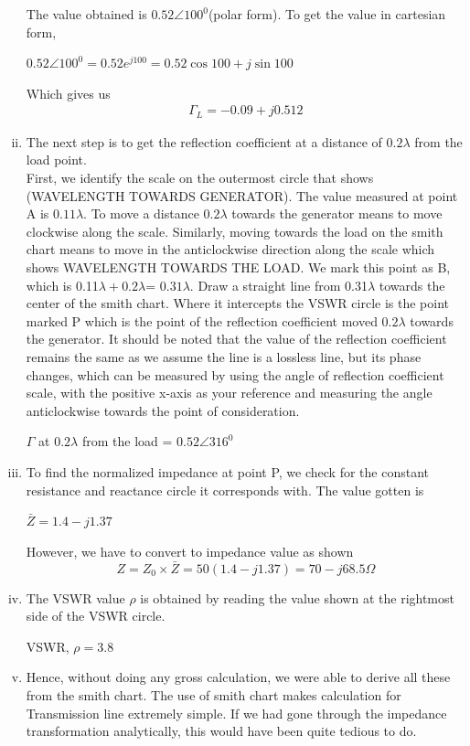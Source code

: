 \begin{example}
\begin{enumerate}[(i)]
The value obtained is $0.52\angle100^{0}$(polar form). To get the value in cartesian form,
\begin{center}
$0.52\angle100^0 = 0.52e^{j100} = 0.52{\cos100 + j\sin100}$
\end{center}
Which gives us
\begin{align*}
\Gamma_{L} = -0.09+j0.512
\end{align*}

\item The next step is to get the reflection coefficient at a distance of $0.2\lambda$ from the load point.\\
First, we identify the scale on the outermost circle that shows (WAVELENGTH TOWARDS GENERATOR). The value measured at point A is $0.11\lambda$. To move a distance $0.2\lambda$ towards the generator means to move clockwise along the scale. Similarly, moving towards the load on the smith chart means to move in the anticlockwise direction along the scale which shows WAVELENGTH TOWARDS THE LOAD. We mark this point as B, which is 0.11$\lambda + 0.2\lambda$= $0.31\lambda$. Draw a straight line from 0.31$\lambda$ towards the center of the smith chart. Where it intercepts the VSWR circle is the point marked P which is the point of the reflection coefficient moved $0.2\lambda$ towards the generator. It should be noted that the value of the reflection coefficient remains the same as we assume the line is a lossless line, but its phase changes, which can be measured by using the angle of reflection coefficient scale, with the positive x-axis as your reference and measuring the angle anticlockwise towards the point of consideration. 

\begin{center}
$\Gamma$ at $0.2\lambda$ from the load  = $0.52\angle316^{0}$
\end{center}

\item To find the normalized impedance at point P, we check for the constant resistance and reactance circle  it corresponds with. The value gotten is 
\begin{center}
$\bar{Z}=1.4-j1.37$
\end{center}
However, we have to convert to impedance value as shown
\begin{dmath*}
Z=Z_{0}\times\bar{Z} = 50(1.4-j1.37) = 70-j68.5\Omega
\end{dmath*}
\item The VSWR value $\rho$ is obtained by reading the value shown at the rightmost side of the VSWR circle.
\begin{center}
VSWR, $\rho = 3.8$
\end{center}
\item Hence, without doing any gross calculation, we were able to derive all these from the smith chart. The use of smith chart makes calculation for Transmission line extremely simple. If we had gone through the impedance transformation analytically, this would have been quite tedious to do.
\end{enumerate}
\end{example}

